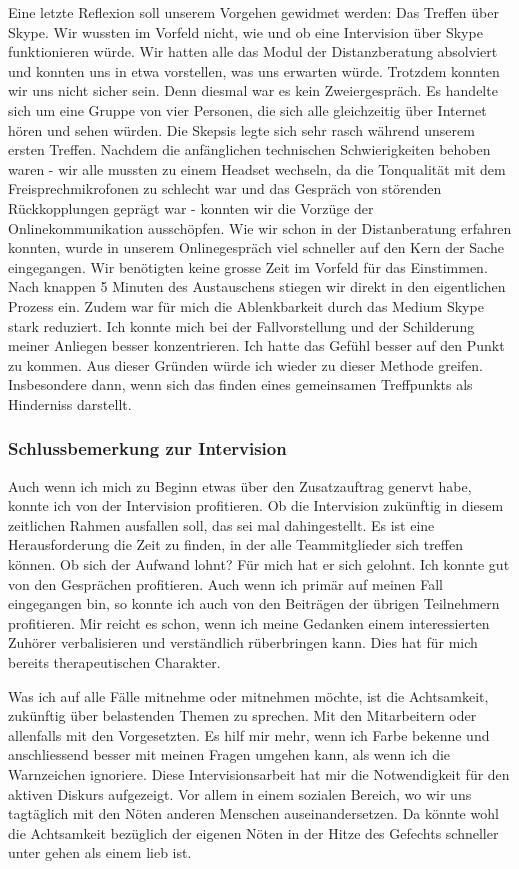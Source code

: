 Eine letzte Reflexion soll unserem Vorgehen gewidmet werden: Das Treffen über Skype. Wir wussten im Vorfeld nicht, wie und ob eine Intervision über Skype funktionieren würde. Wir hatten alle das Modul der Distanzberatung absolviert und konnten uns in etwa vorstellen, was uns erwarten würde. Trotzdem konnten wir uns nicht sicher sein. Denn diesmal war es kein Zweiergespräch. Es handelte sich um eine Gruppe von vier Personen, die sich alle gleichzeitig über Internet hören und sehen würden. Die Skepsis legte sich sehr rasch während unserem ersten Treffen. Nachdem die anfänglichen technischen Schwierigkeiten behoben waren - wir alle mussten zu einem Headset wechseln, da die Tonqualität mit dem Freisprechmikrofonen zu schlecht war und das Gespräch von störenden Rückkopplungen geprägt war - konnten wir die Vorzüge der Onlinekommunikation ausschöpfen. Wie wir schon in der Distanberatung erfahren konnten, wurde in unserem Onlinegespräch viel schneller auf den Kern der Sache eingegangen. Wir benötigten keine grosse Zeit im Vorfeld für das Einstimmen. Nach knappen 5 Minuten des Austauschens stiegen wir direkt in den eigentlichen Prozess ein. Zudem war für mich die Ablenkbarkeit durch das Medium Skype stark reduziert. Ich konnte mich bei der Fallvorstellung und der Schilderung meiner Anliegen besser konzentrieren. Ich hatte das Gefühl besser auf den Punkt zu kommen. Aus dieser Gründen würde ich wieder zu dieser Methode greifen. Insbesondere dann, wenn sich das finden eines gemeinsamen Treffpunkts als Hinderniss darstellt. 

\subsubsection{Schlussbemerkung zur Intervision}
Auch wenn ich mich zu Beginn etwas über den Zusatzauftrag genervt habe, konnte ich von der Intervision profitieren. Ob die Intervision zukünftig in diesem zeitlichen Rahmen ausfallen soll, das sei mal dahingestellt. Es ist eine Herausforderung die Zeit zu finden, in der alle Teammitglieder sich treffen können. Ob sich der Aufwand lohnt? Für mich hat er sich gelohnt. Ich konnte gut von den Gesprächen profitieren. Auch wenn ich primär auf meinen Fall eingegangen bin, so konnte ich auch von den Beiträgen der übrigen Teilnehmern profitieren. Mir reicht es schon, wenn ich meine Gedanken einem interessierten Zuhörer verbalisieren und verständlich rüberbringen kann. Dies hat für mich bereits therapeutischen Charakter.

Was ich auf alle Fälle mitnehme oder mitnehmen möchte, ist die Achtsamkeit, zukünftig über belastenden Themen zu sprechen. Mit den Mitarbeitern oder allenfalls mit den Vorgesetzten. Es hilf mir mehr, wenn ich Farbe bekenne und anschliessend besser mit meinen Fragen umgehen kann, als wenn ich die Warnzeichen ignoriere. Diese Intervisionsarbeit hat mir die Notwendigkeit für den aktiven Diskurs aufgezeigt. Vor allem in einem sozialen Bereich, wo wir uns tagtäglich mit den Nöten anderen Menschen auseinandersetzen. Da könnte wohl die Achtsamkeit bezüglich der eigenen Nöten in der Hitze des Gefechts schneller unter gehen als einem lieb ist.
